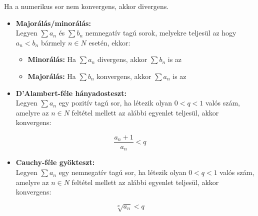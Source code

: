 \documentclass[11pt,a4paper]{article}
\begin{document}
\begin{tcolorbox}[colback=green!5!white,colframe=green!60!black,title= 3. Numerikus sor divergenciája]
    Ha a numerikus sor nem konvergens, akkor divergens.
\end{tcolorbox}

\begin{tcolorbox}[colback=green!5!white,colframe=green!60!black,title= 4. Konvergencia tesztek]
    \begin{itemize}
        \item \textbf{Majorálás/minorálás:}\\
        Legyen \(\sum a_n\) és \(\sum b_n\) nemnegatív tagú sorok, melyekre teljesül az hogy \(a_n < b_n\) bármely \(n \in N\)
        esetén, ekkor:
        \begin{itemize}
        \item \textbf{Minorálás:} Ha \(\sum a_n\) divergens, akkor \(\sum b_n\) is az
        \item \textbf{Majorálás:} Ha \(\sum b_n\) konvergens, akkor \(\sum a_n\) is az
        \end{itemize}
    \end{itemize}
    \begin{itemize}
        \item \textbf{D'Alambert-féle hányadosteszt:}\\
        Legyen \(\sum a_n\) egy pozitív tagú sor, ha létezik olyan \(0 < q < 1\) valós szám, amelyre az \(n \in N\) feltétel
mellett az alábbi egyenlet teljesül, akkor konvergens:
    \end{itemize}
    $$\frac{a_n +1}{a_n} < q$$
    \begin{itemize}
        \item \textbf{Cauchy-féle gyökteszt:}\\
        Legyen \(\sum a_n\) egy nemnegatív tagú sor, ha létezik olyan \(0 < q < 1\) valós szám, amelyre az \(n \in N\)
feltétel mellett az alábbi egyenlet teljesül, akkor konvergens:
    \end{itemize}
    $$\sqrt[n]{a_n} < q$$
\end{tcolorbox}
\end{document}
